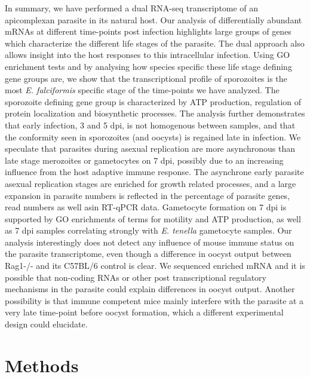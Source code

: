 \documentclass{bmcart}
\begin{document}
In summary, we have performed a dual RNA-seq transcriptome of an apicomplexan parasite in its natural host. Our analysis of differentially abundant mRNAs at different time-points post infection highlights large groups of genes which characterize the different life stages of the parasite. The dual approach also allows insight into the host responses to this intracellular infection. 
Using GO enrichment tests and by analysing how species specific these life stage defining gene groups are, we show that the transcriptional profile of sporozoites is the most \textit{E. falciformis} specific stage of the time-points we have analyzed. The sporozoite defining gene group is characterized by ATP production, regulation of protein localization and biosynthetic processes. The analysis further demonstrates that early infection, 3 and 5 dpi, is not homogenous between samples, and that the conformity seen in sporozoites (and oocysts) is regained late in infection. We speculate that parasites during asexual replication are more asynchronous than late stage merozoites or gametocytes on 7 dpi, possibly due to an increasing influence from the host adaptive immune response. The asynchrone early parasite asexual replication stages are enriched for growth related processes, and a large expansion in parasite numbers is reflected in the percentage of parasite genes, read numbers as well asin RT-qPCR data. Gametocyte formation on 7 dpi is supported by GO enrichments of terms for motility and ATP production, as well as 7 dpi samples correlating strongly with \textit{E. tenella} gametocyte samples.  
Our analysis interestingly does not detect any influence of mouse immune status on the parasite transcriptome, even though a difference in oocyst output between Rag1-/- and its C57BL/6 control is clear. We sequenced enriched mRNA and it is possible that non-coding RNAs or other post transcriptional regulatory mechanisms in the parasite could explain differences in oocyst output. Another possibility is that immune competent mice mainly interfere with the parasite at a very late time-point before oocyst formation, which a different experimental design could elucidate. 


\section*{Methods}
\end{document}
